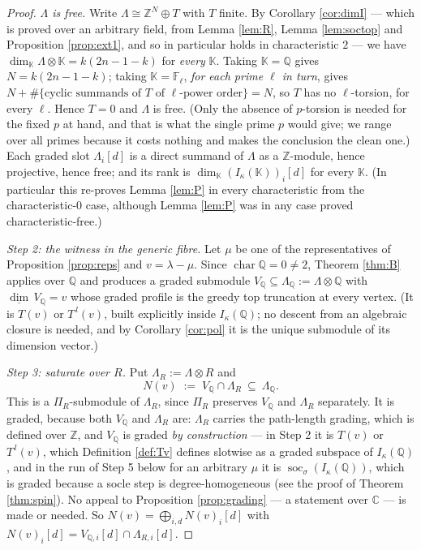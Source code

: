 \documentclass[reqno]{amsart}
\theoremstyle{plain}
\theoremstyle{definition}
\DeclareMathOperator{\soc}{soc}
\newcommand{\dimv}{\underline{\dim}\,}
\newcommand{\la}{\lambda}
\newcommand{\ka}{\kappa}
\newcommand{\Pia}{\Pi}
\begin{document}
\begin{proof}
\emph{$\Lambda$ is free.}  Write $\Lambda\cong\mathbb{Z}^N\oplus T$ with $T$
finite.  By Corollary \ref{cor:dimI} --- which is proved over an arbitrary
field, from Lemma \ref{lem:R}, Lemma \ref{lem:soctop} and Proposition
\ref{prop:ext1}, and so in particular holds in characteristic $2$ --- we have
$\dim_{\mathbb{K}}\Lambda\otimes\mathbb{K}=k(2n-1-k)$ for \emph{every}
$\mathbb{K}$.  Taking $\mathbb{K}=\mathbb{Q}$ gives $N=k(2n-1-k)$; taking
$\mathbb{K}=\mathbb{F}_\ell$, \emph{for each prime $\ell$ in turn}, gives
$N+\#\{\text{cyclic summands of }T\text{ of }\ell\text{-power order}\}=N$, so
$T$ has no $\ell$-torsion, for every $\ell$.  Hence $T=0$ and $\Lambda$ is
free.  (Only the absence of $p$-torsion is needed for the fixed $p$ at hand,
and that is what the single prime $p$ would give; we range over all primes
because it costs nothing and makes the conclusion the clean one.)  Each graded
slot $\Lambda_i[d]$ is a direct summand of $\Lambda$ as a $\mathbb{Z}$-module,
hence projective, hence free; and its rank is
$\dim_{\mathbb{K}}(I_\ka(\mathbb{K}))_i[d]$ for every $\mathbb{K}$.
(In particular this re-proves Lemma \ref{lem:P} in every characteristic from
the characteristic-$0$ case, although Lemma \ref{lem:P} was in any case proved
characteristic-free.)

\smallskip\noindent
\emph{Step 2: the witness in the generic fibre.}  Let $\mu$ be one of the
representatives of Proposition \ref{prop:reps} and $v=\la-\mu$.  Since
$\operatorname{char}\mathbb{Q}=0\ne2$, Theorem \ref{thm:B} applies over
$\mathbb{Q}$ and produces a graded submodule
$V_{\mathbb{Q}}\subseteq\Lambda_{\mathbb{Q}}:=\Lambda\otimes\mathbb{Q}$ with
$\dimv V_{\mathbb{Q}}=v$ whose graded profile is the greedy top truncation at
every vertex.  (It is $T(v)$ or $T^{\,l}(v)$, built explicitly inside
$I_\ka(\mathbb{Q})$; no descent from an algebraic closure is needed, and by
Corollary \ref{cor:pol} it is the unique submodule of its dimension vector.)

\smallskip\noindent
\emph{Step 3: saturate over $R$.}  Put $\Lambda_R:=\Lambda\otimes R$ and
\[
   N(v)\;:=\;V_{\mathbb{Q}}\cap\Lambda_R\ \subseteq\ \Lambda_{\mathbb{Q}} .
\]
This is a $\Pia_R$-submodule of $\Lambda_R$, since $\Pia_R$ preserves
$V_{\mathbb{Q}}$ and $\Lambda_R$ separately.  It is graded, because both
$V_{\mathbb{Q}}$ and $\Lambda_R$ are: $\Lambda_R$ carries the path-length
grading, which is defined over $\mathbb{Z}$, and $V_{\mathbb{Q}}$ is graded
\emph{by construction} --- in Step 2 it is $T(v)$ or $T^{\,l}(v)$, which
Definition \ref{def:Tv} defines slotwise as a graded subspace of
$I_\ka(\mathbb{Q})$, and in the run of Step 5 below for an arbitrary $\mu$ it
is $\soc_\sigma(I_\ka(\mathbb{Q}))$, which is graded because a socle step is
degree-homogeneous (see the proof of Theorem \ref{thm:spin}).  No appeal to
Proposition \ref{prop:grading} --- a statement over $\mathbb{C}$ --- is made
or needed.  So $N(v)=\bigoplus_{i,d}N(v)_i[d]$ with
$N(v)_i[d]=V_{\mathbb{Q},i}[d]\cap\Lambda_{R,i}[d]$.


\end{proof}
\end{document}
